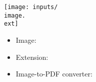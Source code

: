 \documentclass[landscape]{article}
\begin{document}
\texttt{[image: inputs/\\image.\\ext]}

\begin{itemize}
  \makeatletter
  \item Image: \texttt{\image}
  \item Extension: \texttt{\ext}
  \item Image-to-PDF converter: \texttt{\@gfxwand@converter}
  \makeatother
\end{itemize}
\end{document}
